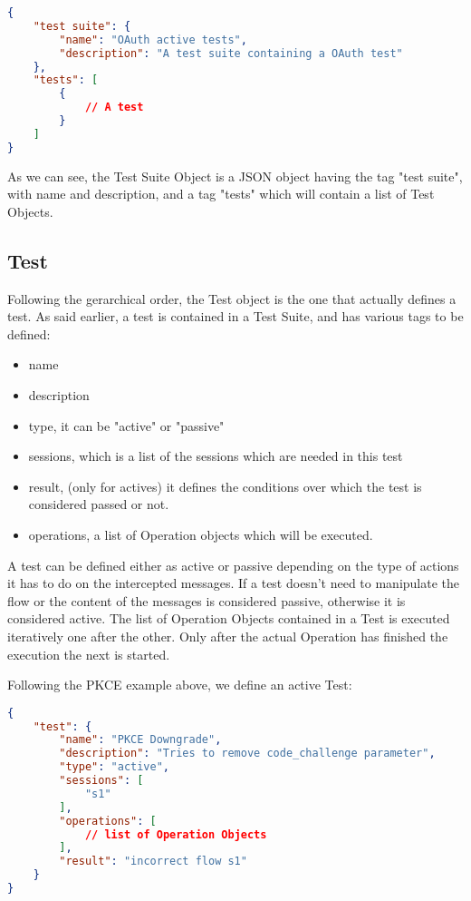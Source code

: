 \begin{lstlisting}[language=json]
{
    "test suite": {
        "name": "OAuth active tests",
        "description": "A test suite containing a OAuth test"
    },
    "tests": [
        {
            // A test
        }
    ]
}
\end{lstlisting}

As we can see, the Test Suite Object is a JSON object having the tag "test suite", with name and description, and a tag "tests" which will contain a list of Test Objects.

\subsection{Test}
Following the gerarchical order, the Test object is the one that actually defines a test. As said earlier, a test is contained in a Test Suite, and has various tags to be defined:
\begin{itemize}
    \item name
    \item description
    \item type, it can be "active" or "passive"
    \item sessions, which is a list of the sessions which are needed in this test
    \item result, (only for actives) it defines the conditions over which the test is considered passed or not.
    \item operations, a list of Operation objects which will be executed.
\end{itemize}

A test can be defined either as active or passive depending on the type of actions it has to do on the intercepted messages. If a test doesn't need to manipulate the flow or the content of the messages is considered passive, otherwise it is considered active.
The list of Operation Objects contained in a Test is executed iteratively one after the other. Only after the actual Operation has finished the execution the next is started.

Following the PKCE example above, we define an active Test:

\begin{lstlisting}[language=json]
{
    "test": {
        "name": "PKCE Downgrade",
        "description": "Tries to remove code_challenge parameter",
        "type": "active",
        "sessions": [
            "s1"
        ],
        "operations": [
            // list of Operation Objects
        ],
        "result": "incorrect flow s1"
    }
}    
\end{lstlisting}

